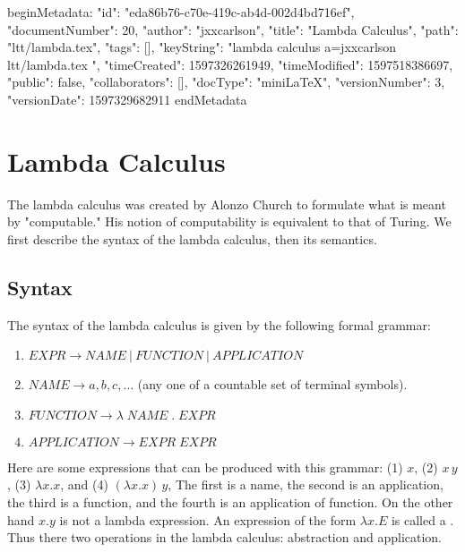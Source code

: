 beginMetadata:
{
    "id": "eda86b76-c70e-419c-ab4d-002d4bd716ef",
    "documentNumber": 20,
    "author": "jxxcarlson",
    "title": "Lambda Calculus",
    "path": "ltt/lambda.tex",
    "tags": [],
    "keyString": "lambda calculus a=jxxcarlson ltt/lambda.tex ",
    "timeCreated": 1597326261949,
    "timeModified": 1597518386697,
    "public": false,
    "collaborators": [],
    "docType": "miniLaTeX",
    "versionNumber": 3,
    "versionDate": 1597329682911
}
endMetadata

\section{Lambda Calculus}


\innertableofcontents

The lambda calculus was created by Alonzo Church to formulate what is meant by "computable."  His notion of computability is equivalent to that of Turing.   We first describe the syntax of the lambda calculus, then its semantics.


\subsection{Syntax}

The syntax of the lambda calculus is given by the following formal grammar:

\begin{enumerate}

\item $EXPR \to NAME\ |\ FUNCTION\ |\ APPLICATION$

\item $NAME \to a, b, c, \ldots$ (any one of a countable set of terminal symbols).

\item $FUNCTION \to\lambda\; NAME\; .\; EXPR$

\item $APPLICATION \to EXPR\; EXPR$

\end{enumerate}

Here are some expressions that can be produced with this grammar: (1) $x$, (2) $x\, y$, (3) $\lambda x.x$, and (4) $(\lambda x.x)\,y$, The first is a name, the second is an application, the third is a function, and the fourth is an application of function.  On the other hand $x . y$ is not a lambda expression.  An expression of the form $\lambda x.E$ is called a .  Thus there two operations in the lambda calculus: abstraction and application.

